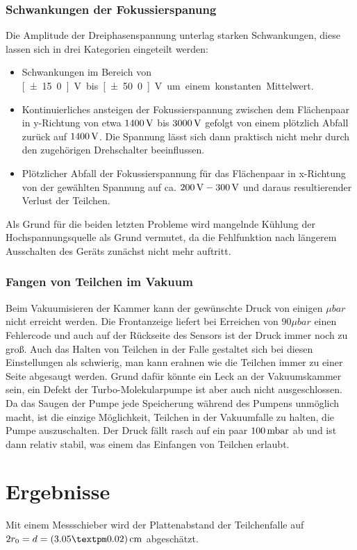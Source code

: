 \documentclass[a4paper,12pt]{article}
\begin{document}
\subsubsection*{Schwankungen der Fokussierspanung}
Die Amplitude der Dreiphasenspannung unterlag starken Schwankungen, diese lassen sich in drei Kategorien eingeteilt werden:
\begin{itemize}
\item
Schwankungen im Bereich von \unit[±15.0]{V} bis \unit[±50.0]{V} um einem konstanten Mittelwert.
\item
Kontinuierliches ansteigen der Fokussierspannung zwischen dem Flächenpaar in y-Richtung von etwa $\unit[1400]{V}$ bis $\unit[3000]{V}$ gefolgt von einem plötzlich
Abfall zurück auf $\unit[1400]{V}$. Die Spannung lässt sich dann praktisch nicht mehr durch den zugehörigen Drehschalter beeinflussen.
\item
Plötzlicher Abfall der Fokussierspannung für das Flächenpaar in x-Richtung von der gewählten Spannung auf ca. $\unit[200]{V} - \unit[300]{V}$ und daraus resultierender
Verlust der Teilchen.
\end{itemize}
Als Grund für die beiden letzten Probleme wird mangelnde Kühlung der Hochspannungsquelle als Grund vermutet, da die Fehlfunktion nach längerem Ausschalten des Geräts zunächst nicht mehr auftritt.

\subsubsection*{Fangen von Teilchen im Vakuum}
Beim Vakuumisieren der Kammer kann der gewünschte Druck von einigen $\unit{μbar}$ nicht erreicht werden.
Die Frontanzeige liefert bei Erreichen von $90μbar$ einen Fehlercode und auch auf der Rückseite des Sensors ist der Druck immer noch zu groß.
Auch das Halten von Teilchen in der Falle gestaltet sich bei diesen Einstellungen als schwierig, man kann erahnen wie die Teilchen immer zu einer Seite abgesaugt werden.
Grund dafür könnte ein Leck an der Vakuumskammer sein, ein Defekt der Turbo-Molekularpumpe ist aber auch nicht ausgeschlossen.
Da das Saugen der Pumpe jede Speicherung während des Pumpens unmöglich macht, ist die einzige Möglichkeit, Teilchen in der Vakuumfalle zu halten, die Pumpe auszuschalten.
Der Druck fällt rasch auf ein paar $\unit[100] {mbar}$ ab und ist dann relativ stabil, was einem das Einfangen von Teilchen erlaubt.

\section{Ergebnisse}\label{Ergebnisse}
Mit einem Messschieber wird der Plattenabstand der Teilchenfalle auf $2r_0 = d = \unit[(3.05±0.02)]{cm}$ abgeschätzt.
\end{document}
